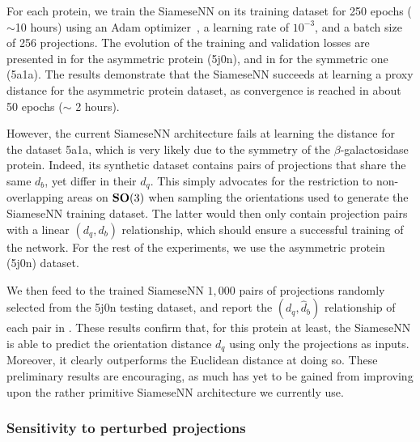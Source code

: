 For each protein, we train the SiameseNN on its training dataset for 250 epochs ($\sim$10 hours) using an Adam optimizer~\cite{kingma2014adam}, a learning rate of $10^{-3}$, and a batch size of 256 projections. The evolution of the training and validation losses are presented in  for the asymmetric protein (5j0n), and in  for the symmetric one (5a1a). The results demonstrate that the SiameseNN succeeds at learning a proxy distance for the asymmetric protein dataset, as convergence is reached in about 50 epochs ($\sim$ 2 hours).

However, the current SiameseNN architecture fails at learning the distance for the dataset 5a1a, which is very likely due to the symmetry of the $\beta$-galactosidase protein. Indeed, its synthetic dataset contains pairs of projections that share the same $d_b$, yet differ in their $d_q$. This simply advocates for the restriction to non-overlapping areas on $\mathrm{\mathbf{SO}}(3)$ when sampling the orientations used to generate the SiameseNN training dataset. The latter would then only contain projection pairs with a linear $(d_q,d_b)$ relationship, which should ensure a successful training of the network. For the rest of the experiments, we use the asymmetric protein (5j0n) dataset.

We then feed to the trained SiameseNN $1,000$ pairs of projections randomly selected from the 5j0n testing dataset, and report the $(d_q,\widehat{d}_b)$ relationship of each pair in . These results confirm that, for this protein at least, the SiameseNN is able to predict the orientation distance $d_q$ using only the projections as inputs. Moreover, it clearly outperforms the Euclidean distance at doing so. These preliminary results are encouraging, as much has yet to be gained from improving upon the rather primitive SiameseNN architecture we currently use.

\subsubsection{Sensitivity to perturbed projections}\label{sec:results:distance-estimation:sensitivity}


